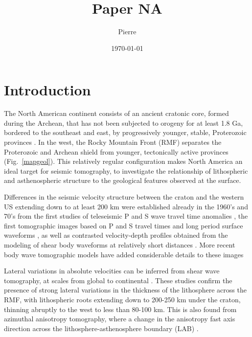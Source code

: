 \documentclass[12pt]{article}
\author{Pierre}
\title{Paper NA}
\date{\today}
\begin{document}
\maketitle

\section{Introduction}

The North American continent consists of an ancient cratonic core, formed during the Archean, that has not been subjected to orogeny for at least 1.8 Ga, bordered to the southeast and east, by progressively younger, stable, Proterozoic provinces \citep{hoffman1988united}. In the west, the Rocky Mountain Front (RMF) separates the Proterozoic and Archean shield from younger, tectonically active provinces (Fig.~\ref{mapgeol}). This relatively regular configuration makes North America an ideal target for seismic tomography, to investigate the relationship of lithospheric and asthenospheric structure to the geological features observed at the surface. 

Differences in the seismic velocity structure between the craton and the western US extending down to at least 200 km were established already in the 1960's and 70's from the first studies of teleseismic P and S wave travel time anomalies  \citep[e.g.][]{cleary1966analysis,herrin1968regional,poupinet1979relation}, the first tomographic images based on P and S travel times \citep{romanowicz1979seismic} and long period surface waveforms \citep{woodhouse1984mapping}, as well as contrasted velocity-depth profiles obtained from the modeling of shear body waveforms at relatively short distances \citep[e.g.][]{grand1984upper}. More recent body wave tomographic models have added considerable details to these images \citep{sigloch2011mantle,burdick2014model,porritt2014seismic,porritt2015lithospheric}

Lateral variations in absolute velocities can be inferred from shear wave tomography, at scales from global \citep[e.g.][]{su1994degree,megnin2000three,shapiro2002monte,panning2006three,kustowski2008anisotropic,ritsema2010s40rts,lekic2011inferring,debayle2012global,schaeffer2013global} to continental \citep{lee2005surface,yuan20113,yuan2014lithospheric,schaeffer2014imaging}. These studies confirm the presence of strong lateral variations in the thickness of the lithosphere across the RMF, with lithospheric roots extending down to 200-250 km under the craton, thinning abruptly to the west to less than 80-100 km. This is also found from azimuthal anisotropy tomography, where  a change in the anisotropy fast axis direction across the lithosphere-asthenosphere boundary (LAB) \citep{marone2007depth,yuan2010lithospheric}.
\end{document}
